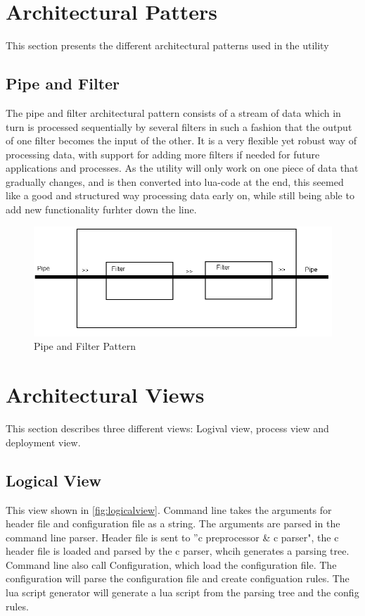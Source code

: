 \section{Architectural Patters}
This section presents the different architectural patterns used in the \gls{utility}

\subsection{Pipe and Filter}
The pipe and filter architectural pattern consists of a stream of data which in turn is processed sequentially by several filters in such a fashion that the output of one filter becomes the input of the other. It is a very flexible yet robust way of processing data, with support for adding more filters if needed for future applications and processes. As the \gls{utility} will only work on one piece of data that gradually changes, and is then converted into \Gls{lua}-code at the end, this seemed like a good and structured way processing data early on, while still being able to add new functionality furhter down the line.

\begin{figure}[htb]
	\includegraphics[width=\textwidth]{./planning/img/PipeAndFilter}
	\caption{Pipe and Filter Pattern\label{fig:pipefilter}}
\end{figure}


\section{Architectural Views}
This section describes three different views: Logival view, process view and deployment view.

\subsection{Logical View}
This view shown in \autoref{fig:logicalview}. Command line takes the arguments for \gls{header} file and configuration file as a string. The arguments are parsed in the command line \gls{parser}. Header file is sent to ''\Gls{c} \gls{preprocessor} \& \Gls{c} \gls{parser}", the \Gls{c} \gls{header} file is loaded and parsed by the \Gls{c} \gls{parser}, whcih generates a parsing tree. Command line also call Configuration, which load the configuration file. The configuration will parse the configuration file and create configuation rules. The \Gls{lua} \gls{script} generator will generate a \Gls{lua} \gls{script} from the parsing tree and the config rules.

